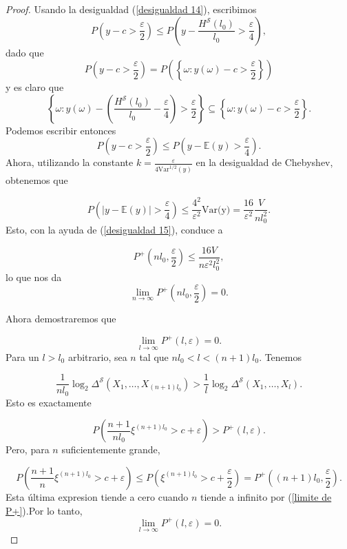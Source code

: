 \documentclass{report}
\begin{document}
\begin{proof}
    Usando la desigualdad (\ref{desigualdad 14}), escribimos 
    \[
    P\left( y - c > \frac{\varepsilon}{2} \right) 
    \leq P\left( y - \frac{H^{\mathcal{S}}(l_0)}{l_0} > \frac{\varepsilon}{4} \right),
    \]
    dado que
    \[
        P\left( y - c > \frac{\varepsilon}{2} \right) = P\left(\left\{\omega: y(\omega) - c > \frac{\varepsilon}{2} \right\}\right)
    \]
    y es claro que
    \[
        \left\{\omega: y(\omega) - \left(\frac{H^{\mathcal{S}}(l_0)}{l_0} -\frac{\varepsilon}{4}\right)
        > \frac{\varepsilon}{2} \right\} \subseteq   \left\{\omega: y(\omega) - c > \frac{\varepsilon}{2} \right\}.
    \]
    Podemos escribir entonces
    \[
        P\left( y - c > \frac{\varepsilon}{2} \right) 
        \leq P\left( y - \mathbb{E}(y) > \frac{\varepsilon}{4} \right).
    \]
    Ahora, utilizando la constante \( k = \frac{\varepsilon}{4\text{Var}^{1/2}(y)} \) en la desigualdad de Chebyshev, obtenemos que

    \[P\left( |y - \mathbb{E}(y)| > \frac{\varepsilon}{4} \right) \leq \frac{4^2}{\varepsilon^2}\text{Var(y)} =  \frac{16}{\varepsilon^2}\frac{V}{n l_0^2}.\]
    Esto, con la ayuda de (\ref{desigualdad 15}), conduce a

    \[
    P^+\left(n l_0, \frac{\varepsilon}{2} \right) 
    \leq \frac{16V}{n \varepsilon^2 l_0^2},
    \]
    lo que nos da
    \begin{equation}\label{limite de P+}
        \lim_{n \to \infty} P^+\left(n l_0, \frac{\varepsilon}{2} \right) = 0.
    \end{equation}
\bigskip

    Ahora demostraremos que

    \[
    \lim_{l \to \infty} P^+(l, \varepsilon) = 0.
    \]
    Para un \( l > l_0 \) arbitrario, sea \( n \) tal que \( n l_0 < l < (n+1)l_0 \). Tenemos

    \[
    \frac{1}{n l_0} \log_2 \Delta^{\mathcal{S}}(X_1, \dots, X_{(n+1)l_0}) > \frac{1}{l} \log_2 \Delta^{\mathcal{S}}(X_1, \dots, X_l).
    \]
    Esto es exactamente
    
    \[
    P\left( \frac{n+1}{n l_0} \xi^{(n+1)l_0} > c + \varepsilon \right) > P^+(l, \varepsilon).
    \]
    Pero, para \( n \) suficientemente grande,
    
    \[
    P\left( \frac{n+1}{n} \xi^{(n+1)l_0} > c + \varepsilon \right) 
    \leq P\left( \xi^{(n+1)l_0} > c + \frac{\varepsilon}{2} \right) 
    = P^+\left( (n+1)l_0, \frac{\varepsilon}{2} \right).
    \]
    Esta última expresion tiende a cero cuando $n$ tiende a infinito por (\ref{limite de P+}).Por lo tanto,
    \begin{equation}\label{eq 16}
    \lim_{l \to \infty} P^+(l, \varepsilon) = 0.
    \end{equation}
    \bigskip


\end{proof}
\end{document}
